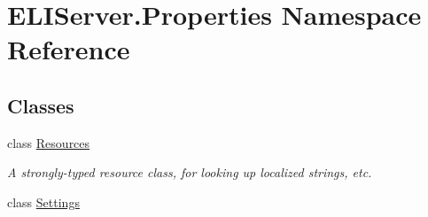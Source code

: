\hypertarget{namespace_e_l_i_server_1_1_properties}{}\section{E\+L\+I\+Server.\+Properties Namespace Reference}
\label{namespace_e_l_i_server_1_1_properties}
\subsection*{Classes}
\begin{DoxyCompactItemize}
\item 
class \hyperlink{class_e_l_i_server_1_1_properties_1_1_resources}{Resources}
\begin{DoxyCompactList}\small\item\em A strongly-\/typed resource class, for looking up localized strings, etc. \end{DoxyCompactList}\item 
class \hyperlink{class_e_l_i_server_1_1_properties_1_1_settings}{Settings}
\end{DoxyCompactItemize}
